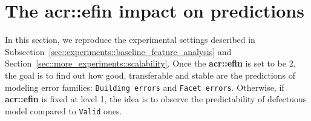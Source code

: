 \section{The \texorpdfstring{\acrlong*{acr::efin}}{eFin} impact on predictions}
    \label{sec::more_experiments::finesse}
    In this section, we reproduce the experimental settings described in Subsection~\ref{sec::experiments::baseline_feature_analysis} and Section~\ref{sec::more_experiments::scalability}.
    Once the \textbf{\gls{acr::efin}} is set to be 2, the goal is to find out how good, transferable and stable are the predictions of modeling error families: \texttt{Building errors} and \texttt{Facet errors}.
    Otherwise, if \textbf{\gls{acr::efin}} is fixed at level 1, the idea is to observe the predictability of defectuous model compared to \texttt{Valid} ones.
    
